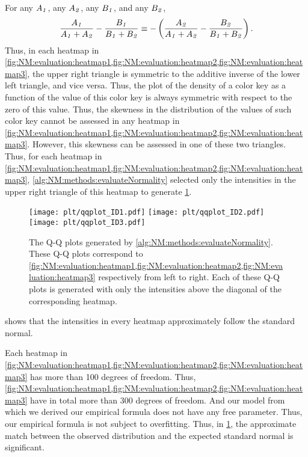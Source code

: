 For 	
any \(A_{\mathit{1}}\), 
any \(A_{\mathit{2}}\), 
any \(B_{\mathit{1}}\),	
and any \(B_{\mathit{2}}\),
		\[
		\frac{A_{\mathit{1}}}{A_{\mathit{1}} + A_{\mathit{2}}} - 
		\frac{B_{\mathit{1}}}{B_{\mathit{1}} + B_{\mathit{2}}} 
	\equiv
	  -\left(\frac{A_{\mathit{2}}}{A_{\mathit{1}} + A_{\mathit{2}}} -
		       \frac{B_{\mathit{2}}}{B_{\mathit{1}} + B_{\mathit{2}}}\right)
		.\]	 
Thus, in each heatmap in \cref{fig:NM:evaluation:heatmap1,fig:NM:evaluation:heatmap2,fig:NM:evaluation:heatmap3},
	the upper right triangle is symmetric to the additive inverse of the lower left triangle, and vice versa.{}
Thus, the plot of the density of a color key as a function of the value of this color key is always symmetric with respect to the zero of this value.
Thus, the skewness in the distribution of the values of such color key cannot be assessed in any heatmap in
		\cref{fig:NM:evaluation:heatmap1,fig:NM:evaluation:heatmap2,fig:NM:evaluation:heatmap3}.
However, this skewness can be assessed in one of these two triangles.
Thus, for each heatmap in \cref{fig:NM:evaluation:heatmap1,fig:NM:evaluation:heatmap2,fig:NM:evaluation:heatmap3},
	\cref{alg:NM:methods:evaluateNormality} selected only the intensities in the upper right triangle of this heatmap to generate \cref{fig:NM:evaluation:qqplot}.
\begin{figure}
\texttt{[image: plt/qqplot\_ID1.pdf]}
\texttt{[image: plt/qqplot\_ID2.pdf]}
\texttt{[image: plt/qqplot\_ID3.pdf]}
\caption[
	The Q-Q plots generated by \cref{alg:NM:methods:evaluateNormality}.]{
	The Q-Q plots generated by \cref{alg:NM:methods:evaluateNormality}.
	These Q-Q plots correspond to	\cref{fig:NM:evaluation:heatmap1,fig:NM:evaluation:heatmap2,fig:NM:evaluation:heatmap3} respectively from left to right.
	Each of these Q-Q plots is generated with only the intensities above the diagonal of the corresponding heatmap.
	\label{fig:NM:evaluation:qqplot}
}
\end{figure}
 shows that the intensities in every heatmap 
		approximately follow the standard normal.

Each heatmap in \cref{fig:NM:evaluation:heatmap1,fig:NM:evaluation:heatmap2,fig:NM:evaluation:heatmap3} has more than 100 degrees of freedom.
Thus, \cref{fig:NM:evaluation:heatmap1,fig:NM:evaluation:heatmap2,fig:NM:evaluation:heatmap3} have in total more than 300 degrees of freedom.
And our model from which we derived our empirical formula does not have any free parameter.
Thus, our empirical formula is not subject to overfitting.		
Thus, in \cref{fig:NM:evaluation:qqplot}, the approximate match between the observed distribution and the expected standard normal is significant.
		
